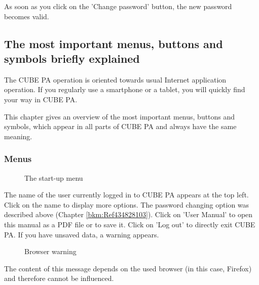 As soon as you click on the 'Change password' button, the new password becomes valid.

\subsection{The most important menus, buttons and symbols briefly explained}

The CUBE PA operation is oriented towards usual Internet application operation. If you regularly use a smartphone or a tablet, you will quickly find your way in CUBE PA.

\vspace{\baselineskip}

This chapter gives an overview of the most important menus, buttons and symbols, which appear in all parts of CUBE PA and always have the same meaning.

\pagebreak

\subsubsection{Menus}

\begin{figure}[H]
\caption{The start-up menu}
\end{figure}


The name of the user currently logged in to CUBE PA appears at the top left. Click on the name to display more options. The password changing option was described above (Chapter \ref{bkm:Ref434828103}). Click on 'User Manual' to open this manual as a PDF file or to save it. Click on 'Log out' to directly exit CUBE PA. If you have unsaved data, a warning appears.

\begin{figure}[H]
\caption{Browser warning}
\end{figure}
\begin{small}
The content of this message depends on the used browser (in this case, Firefox) and therefore cannot be influenced.
\end{small}

